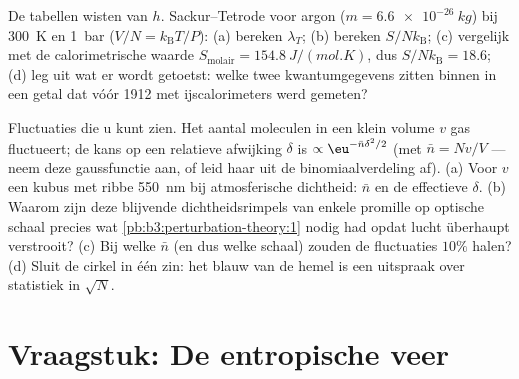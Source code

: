 \begin{exercise}[$\star\star\star$]\label{exo:b3:microcanonical-ensemble:11}
De tabellen wisten van $h$. Sackur--Tetrode voor argon ($m =
\qty{6.6e-26}{kg}$) bij \qty{300}{K} en \qty{1}{bar} ($V/N =
k_{\text{B}}T/P$): (a) bereken $\lambda_T$; (b) bereken $S/N
k_{\text{B}}$; (c) vergelijk met de calorimetrische waarde
$S_{\text{molair}} = \qty{154.8}{J/(mol.K)}$, dus $S/Nk_{\text{B}}
= 18.6$;
(d) leg uit wat er wordt getoetst: welke twee kwantumgegevens zitten
binnen in een getal dat vóór 1912 met ijscalorimeters werd gemeten?
\end{exercise}

\begin{exercise}[$\star\star\star$]\label{exo:b3:microcanonical-ensemble:12}
Fluctuaties die u kunt zien. Het aantal moleculen in een klein volume $v$
gas fluctueert; de kans op een relatieve afwijking $\delta$ is
$\propto\eu^{-\bar n\delta^2/2}$ (met $\bar n = Nv/V$ --- neem deze
gaussfunctie aan, of leid haar uit de binomiaalverdeling af). (a) Voor $v$
een kubus met ribbe \qty{550}{nm} bij atmosferische dichtheid: $\bar n$ en
de effectieve $\delta$. (b) Waarom zijn deze blijvende dichtheidsrimpels
van enkele promille op optische schaal precies wat
\cref{pb:b3:perturbation-theory:1} nodig had opdat lucht überhaupt
verstrooit? (c) Bij welke $\bar n$ (en dus welke schaal) zouden de
fluctuaties $10\%$ halen? (d) Sluit de cirkel in één zin: het blauw van de
hemel is een uitspraak over statistiek in $\sqrt N$.
\end{exercise}

\section{Vraagstuk: De entropische veer}

